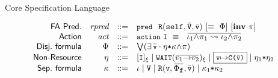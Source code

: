 \begin{frame}{Core Specification Language}
  \begin{small}
  \begin{center}
  \[
  \begin{array}{rrll}
    \!\!\!\!\textsf{FA~Pred.} & \nonterm{rpred} & {::=} &
    \code{pred}~~\btt{R}(\self,\overbar{\rsrvar},\vlist{v})  
~[\veq~\constr]~[\lit{inv}~\pure]\\

\!\!\!\!\textsf{Action} & \nonterm{act} & {::=} &
\code{action}~\code{I}~\veq~ 
~\overbar{\aheap_1{\wedge}{\pure_1} \rightsquigarrow \aheap_2{\wedge}{\pure_2}
} \\

\!\!\!\!\textsf{Disj.~formula} & \constr & {::=} & \bigvee ( \exists \vlist{v} \cdot
 {\bheap}{\sep}
 \heap {\wedge} \pure) \\

 \!\!\!\!\textsf{Non-Resource}
& \!\! \bheap & {::=} & {[\code{I}]_{\grammarPerm}} \mid
 \code{WAIT}({\overbar{v_1{\ra}v_2}})\addperm{}{\grammarPerm} \mid 
\GLOBAL{\code{v}}{\code{C}(\vlist{v})} 
\mid \bheap_1 {\sep} \bheap_2
\\
 
\!\!\!\!\textsf{Sep.~formula} & \heap & {::=} & %
\aheap
\mid 
\hidefa{[\sm{\OM}]\,}\rsrvar
\mid \rnpredl{\btt{R}}{\vlist{v}}{\code{v},\overbar{\fconstr},\vlist{v}}
\mid  \heap_1 \sep \heap_2 \\


\end{array}\]
\end{center}
\end{small}
\end{frame}
